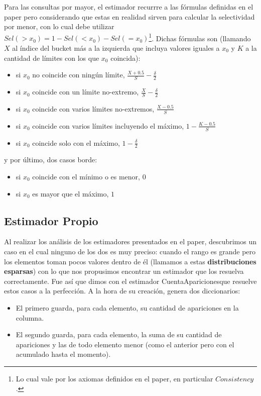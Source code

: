 Para las consultas por mayor, el estimador recurrre a las fórmulas definidas en el paper pero considerando que estas en realidad sirven para calcular la selectividad por menor, con lo cual debe utilizar $Sel(>x_0) = 1 - Sel(<x_0) - Sel(=x_0)$\footnote{Lo cual vale por los axiomas definidos en el paper, en particular $Consistency$.}. Dichas fórmulas son (llamando $X$ al índice del bucket más a la izquierda que incluya valores iguales a $x_0$ y $K$ a la cantidad de límites con los que $x_0$ coincida):
\begin{itemize}
 \item si $x_0$ no coincide con ningún límite, $\frac{X+0.5}{S} - \frac{\delta}{2}$
 \item si $x_0$ coincide con un límite no-extremo, $\frac{X}{S} - \frac{\delta}{2}$
 \item si $x_0$ coincide con varios límites no-extremos, $\frac{X-0.5}{S}$
 \item si $x_0$ coincide con varios límites incluyendo el máximo, $1 - \frac{K-0.5}{S}$
 \item si $x_0$ coincide solo con el máximo, $1 - \frac{\delta}{2}$
\end{itemize}
y por último, dos casos borde:
\begin{itemize}
 \item si $x_0$ coincide con el mínimo o es menor, $0$
 \item si $x_0$ es mayor que el máximo, $1$
\end{itemize}

\subsection{Estimador Propio}
Al realizar los análisis de los estimadores presentados en el paper, descubrimos un caso en el cual ninguno de los dos es muy preciso: cuando el rango es grande pero los elementos toman pocos valores dentro de él (llamamos a estas \textbf{distribuciones esparsas}) con lo que nos propusimos encontrar un estimador que los resuelva correctamente. Fue así que dimos con el estimador CuentaApariciones\texttrademark que resuelve estos casos a la perfección. A la hora de su creación, genera dos diccionarios:
\begin{itemize}
 \item El primero guarda, para cada elemento, su cantidad de apariciones en la columna.
 \item El segundo guarda, para cada elemento, la suma de su cantidad de apariciones y las de todo elemento menor (como el anterior pero con el acumulado hasta el momento).
\end{itemize}

